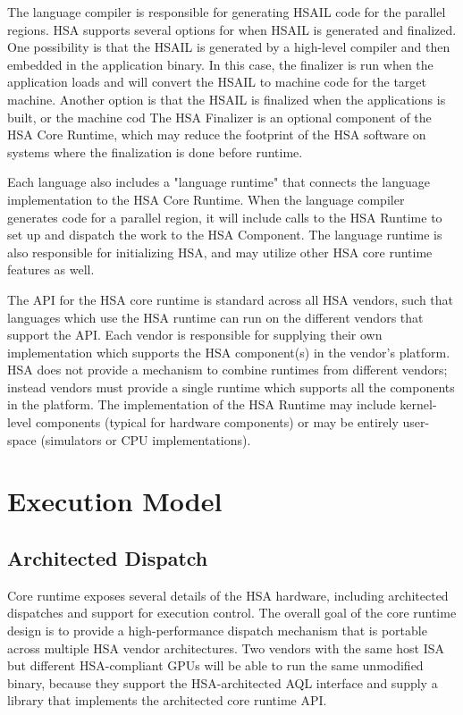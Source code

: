 \documentclass[final]{book}
\begin{document}
The language compiler is responsible for generating HSAIL code for the parallel
regions. HSA supports several options for when HSAIL is generated and
finalized. One possibility is that the HSAIL is generated by a high-level
compiler and then embedded in the application binary. In this case, the
finalizer is run when the application loads and will convert the HSAIL to
machine code for the target machine. Another option is that the HSAIL is
finalized when the applications is built, or the machine cod The HSA Finalizer
is an optional component of the HSA Core Runtime, which may reduce the footprint
of the HSA software on systems where the finalization is done before runtime.

Each language also includes a "language runtime" that connects the language
implementation to the HSA Core Runtime. When the language compiler generates
code for a parallel region, it will include calls to the HSA Runtime to set up
and dispatch the work to the HSA Component. The language runtime is also
responsible for initializing HSA, and may utilize other HSA core runtime
features as well.

The API for the HSA core runtime is standard across all HSA vendors, such that
languages which use the HSA runtime can run on the different vendors that
support the API. Each vendor is responsible for supplying their own
implementation which supports the HSA component(s) in the vendor's platform. HSA
does not provide a mechanism to combine runtimes from different vendors; instead
vendors must provide a single runtime which supports all the components in the
platform. The implementation of the HSA Runtime may include kernel-level
components (typical for hardware components) or may be entirely user-space
(simulators or CPU implementations).

\hypertarget{executionmodel}{}\section{Execution
Model}\label{executionmodel}


\hypertarget{archdispatch}{}\subsection{Architected Dispatch}
\label{archdispatch}

Core runtime exposes several details of the HSA hardware, including architected
dispatches and support for execution control. The overall goal of the core
runtime design is to provide a high-\/performance dispatch mechanism that is
portable across multiple HSA vendor architectures. Two vendors with the same
host ISA but different HSA-\/compliant GPUs will be able to run the same
unmodified binary, because they support the HSA-\/architected AQL interface and
supply a library that implements the architected core runtime API.
\end{document}
